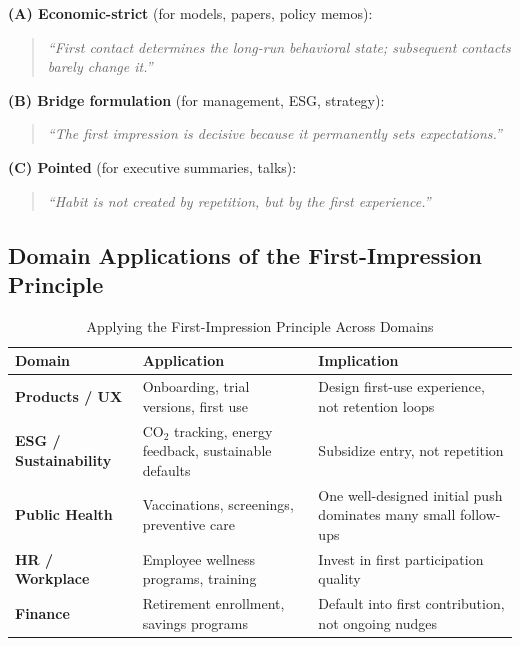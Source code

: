 \begin{tcolorbox}[colback=green!5!white, colframe=green!75!black,
    title=Three Formulations for Different Audiences]

\textbf{(A) Economic-strict} (for models, papers, policy memos):
\begin{quote}
\textit{``First contact determines the long-run behavioral state; subsequent contacts barely change it.''}
\end{quote}

\textbf{(B) Bridge formulation} (for management, ESG, strategy):
\begin{quote}
\textit{``The first impression is decisive because it permanently sets expectations.''}
\end{quote}

\textbf{(C) Pointed} (for executive summaries, talks):
\begin{quote}
\textit{``Habit is not created by repetition, but by the first experience.''}
\end{quote}

\end{tcolorbox}

\subsection{Domain Applications of the First-Impression Principle}

\begin{table}[htbp]
\centering
\caption{Applying the First-Impression Principle Across Domains}
\label{tab:hf-first-impression}
\renewcommand{\arraystretch}{1.4}
\begin{tabular}{@{}p{2.5cm}p{4cm}p{5.5cm}@{}}
\toprule
\textbf{Domain} & \textbf{Application} & \textbf{Implication} \\
\midrule
\textbf{Products / UX} & Onboarding, trial versions, first use & Design first-use experience, not retention loops \\
\textbf{ESG / Sustainability} & CO$_2$ tracking, energy feedback, sustainable defaults & Subsidize entry, not repetition \\
\textbf{Public Health} & Vaccinations, screenings, preventive care & One well-designed initial push dominates many small follow-ups \\
\textbf{HR / Workplace} & Employee wellness programs, training & Invest in first participation quality \\
\textbf{Finance} & Retirement enrollment, savings programs & Default into first contribution, not ongoing nudges \\
\bottomrule
\end{tabular}
\end{table}

